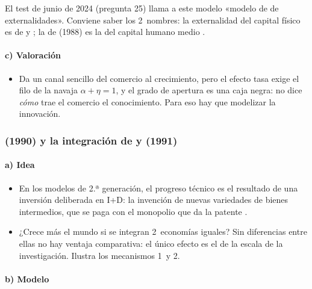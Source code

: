 \documentclass[11pt]{article}
\begin{document}
\begin{notaopositor}
El test de junio de 2024 (pregunta 25) llama a este modelo «modelo de  de externalidades». Conviene saber los 2~nombres: la externalidad del capital físico es de  y ; la de  (1988) es la del capital humano medio .
\end{notaopositor}

\paragraph{c) Valoración}

\begin{itemize}
\item Da un canal sencillo del comercio al crecimiento, pero el efecto tasa exige el filo de la navaja $\alpha+\eta=1$, y el grado de apertura es una caja negra: no dice \emph{cómo} trae el comercio el conocimiento. Para eso hay que modelizar la innovación.
\end{itemize}

\subsubsection{ (1990) y la integración de  y  (1991)}\label{sec:romer}

\paragraph{a) Idea}

\begin{itemize}
\item En los modelos de 2.ª generación, el progreso técnico es el resultado de una inversión deliberada en I+D: la invención de nuevas variedades de bienes intermedios, que se paga con el monopolio que da la patente\nocite{Romer1990Endogenous} .
\item ¿Crece más el mundo si se integran 2~economías iguales? Sin diferencias entre ellas no hay ventaja comparativa: el único efecto es el de la escala de la investigación\nocite{RiveraBatizRomer1991}. Ilustra los mecanismos 1~y 2.
\end{itemize}

\paragraph{b) Modelo}
\end{document}
